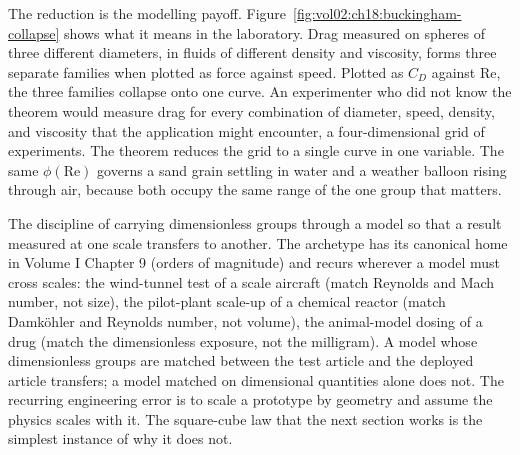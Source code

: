 The reduction is the modelling payoff.
Figure~\ref{fig:vol02:ch18:buckingham-collapse} shows what it means in
the laboratory. Drag measured on spheres of three different diameters,
in fluids of different density and viscosity, forms three separate
families when plotted as force against speed. Plotted as $C_D$ against
$\mathrm{Re}$, the three families collapse onto one curve. An
experimenter who did not know the theorem would measure drag for every
combination of diameter, speed, density, and viscosity that the
application might encounter, a four-dimensional grid of experiments. The
theorem reduces the grid to a single curve in one variable. The same
$\phi(\mathrm{Re})$ governs a sand grain settling in water and a weather
balloon rising through air, because both occupy the same range of the
one group that matters.



\begin{archetype}
The discipline of carrying dimensionless groups through a model so that
a result measured at one scale transfers to another. The archetype has
its canonical home in Volume I Chapter 9 (orders of magnitude) and
recurs wherever a model must cross scales: the wind-tunnel test of a
scale aircraft (match Reynolds and Mach number, not size), the
pilot-plant scale-up of a chemical reactor (match Damk\"ohler and
Reynolds number, not volume), the animal-model dosing of a drug (match
the dimensionless exposure, not the milligram). A model whose
dimensionless groups are matched between the test article and the
deployed article transfers; a model matched on dimensional quantities
alone does not. The recurring engineering error is to scale a prototype
by geometry and assume the physics scales with it. The square-cube law
that the next section works is the simplest instance of why it does not.
\end{archetype}

